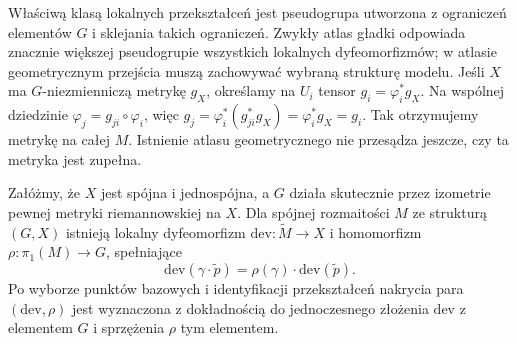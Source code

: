 Właściwą klasą lokalnych przekształceń jest pseudogrupa
utworzona z ograniczeń elementów $G$ i sklejania takich
ograniczeń. Zwykły atlas gładki odpowiada znacznie większej
pseudogrupie wszystkich lokalnych dyfeomorfizmów;
w atlasie geometrycznym przejścia muszą zachowywać
wybraną strukturę modelu.
Jeśli $X$ ma $G$-niezmienniczą metrykę $g_X$, określamy
na $U_i$ tensor $g_i=\varphi_i^*g_X$.
Na wspólnej dziedzinie $\varphi_j=g_{ji}\circ\varphi_i$,
więc
$g_j=\varphi_i^*(g_{ji}^*g_X)=\varphi_i^*g_X=g_i$.
Tak otrzymujemy metrykę na całej $M$.
Istnienie atlasu geometrycznego nie przesądza jeszcze,
czy ta metryka jest zupełna.

\begin{twierdzenie}
\label{thm:thur-dop-dev-hol}
Załóżmy, że $X$ jest spójna i jednospójna, a $G$ działa
skutecznie przez izometrie pewnej metryki riemannowskiej
na $X$. Dla spójnej rozmaitości $M$ ze strukturą $(G,X)$
istnieją lokalny dyfeomorfizm
$\mathrm{dev}:\widetilde M\to X$ i homomorfizm
$\rho:\pi_1(M)\to G$, spełniające
\begin{equation}\label{eq:thur-dop-dev-equiv}
 \mathrm{dev}(\gamma\cdot\widetilde p)
 =\rho(\gamma)\cdot\mathrm{dev}(\widetilde p).
\end{equation}
Po wyborze punktów bazowych i identyfikacji przekształceń
nakrycia para $(\mathrm{dev},\rho)$ jest wyznaczona z dokładnością
do jednoczesnego złożenia $\mathrm{dev}$ z elementem $G$
i sprzężenia $\rho$ tym elementem.
\end{twierdzenie}
